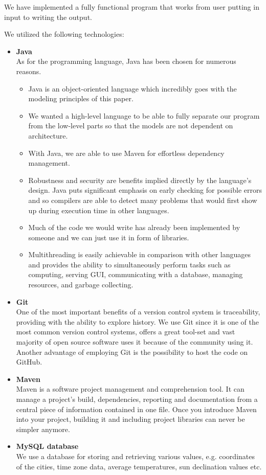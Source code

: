 
We have implemented a fully functional program that works from user putting in input to writing the output.

We utilized the following technologies:

\begin{itemize}
\item \textbf{Java}\\
As for the programming language, Java has been chosen for numerous reasons.
\begin{itemize}
\item Java is an object-oriented language which incredibly goes with the modeling principles of this paper.
\item We wanted a high-level language to be able to fully separate our program from the low-level parts so that the models are not dependent on architecture.
\item With Java, we are able to use Maven for effortless dependency management.
\item Robustness and security are benefits implied directly by the language's design. Java puts significant emphasis on early checking for possible errors and so compilers are able to detect many problems that would first show up during execution time in other languages.
\item Much of the code we would write has already been implemented by someone and we can just use it in form of libraries.
\item Multithreading is easily achievable in comparison with other languages and provides the ability to simultaneously perform tasks such as computing, serving GUI, communicating with a database, managing resources, and garbage collecting.
\end{itemize}
\item \textbf{Git}\\
One of the most important benefits of a version control system is traceability, providing with the ability to explore history. We use Git since it is one of the most common version control systems, offers a great tool-set and vast majority of open source software uses it because of the community using it. Another advantage of employing Git is the possibility to host the code on GitHub.
\item \textbf{Maven}\\
Maven is a software project management and comprehension tool. It can manage a project's build, dependencies, reporting and documentation from a central piece of information contained in one file. Once you introduce Maven into your project, building it and including project libraries can never be simpler anymore.
\item \textbf{MySQL database}\\
We use a database for storing and retrieving various values, e.g. coordinates of the cities, time zone data, average temperatures, sun declination values etc.
\end{itemize}

